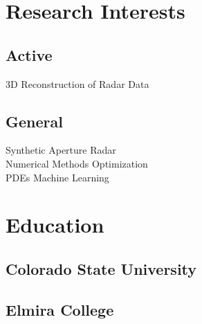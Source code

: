 \documentclass[letterpaper]{pine-resume} %
\begin{document}
\begin{minipage}[t]{0.33\textwidth} %


\section{Research Interests}

\subsection{Active}
3D Reconstruction of Radar Data \\

\subsection{General}
Synthetic Aperture Radar \\
Numerical Methods \textbullet{} Optimization \\
PDEs \textbullet{} Machine Learning


\sectionspace %


\section{Education}

\subsection{Colorado State University}


\sectionspace %


\sectionspace %


\subsection{Elmira College}


\end{minipage}
\end{document}
